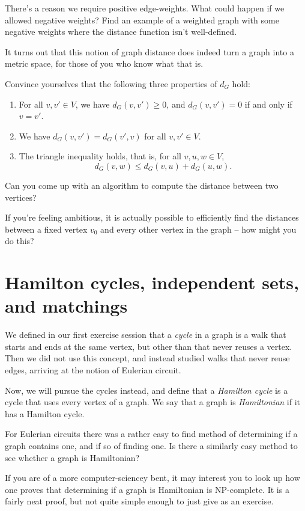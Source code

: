 \documentclass[nobib]{tufte-handout}
\begin{document}
\begin{xca}
  There's a reason we require positive edge-weights. What could happen if we allowed negative weights? Find an example of a weighted graph with some negative weights where the distance function isn't well-defined.
\end{xca}

It turns out that this notion of graph distance does indeed turn a graph into a metric space, for those of you who know what that is.

\begin{xca}
  Convince yourselves that the following three properties of $d_G$ hold:
  \begin{enumerate}
    \item For all $v, v' \in V$, we have $d_G(v, v') \geq 0$, and $d_G(v,v') = 0$ if and only if $v = v'$.
    \item We have $d_G(v,v') = d_G(v',v)$ for all $v, v' \in V$.
    \item The triangle inequality holds, that is, for all $v, u, w \in V$,
    $$d_G(v, w) \leq d_G(v, u) + d_G(u, w).$$
  \end{enumerate}
\end{xca}

\begin{xca}
  Can you come up with an algorithm to compute the distance between two vertices?

  If you're feeling ambitious, it is actually possible to efficiently find the distances between a fixed vertex $v_0$ and every other vertex in the graph -- how might you do this?
\end{xca}

\section{Hamilton cycles, independent sets, and matchings}

We defined in our first exercise session that a \emph{cycle} in a graph is a walk that starts and ends at the same vertex, but other than that never reuses a vertex. Then we did not use this concept, and instead studied walks that never reuse edges, arriving at the notion of Eulerian circuit.

Now, we will pursue the cycles instead, and define that a \emph{Hamilton cycle} is a cycle that uses every vertex of a graph. We say that a graph is \emph{Hamiltonian} if it has a Hamilton cycle.

\begin{xca}
  For Eulerian circuits there was a rather easy to find method of determining if a graph contains one, and if so of finding one. Is there a similarly easy method to see whether a graph is Hamiltonian?
\end{xca}

If you are of a more computer-sciencey bent, it may interest you to look up how one proves that determining if a graph is Hamiltonian is NP-complete. It is a fairly neat proof, but not quite simple enough to just give as an exercise.

%
%
\end{document}
